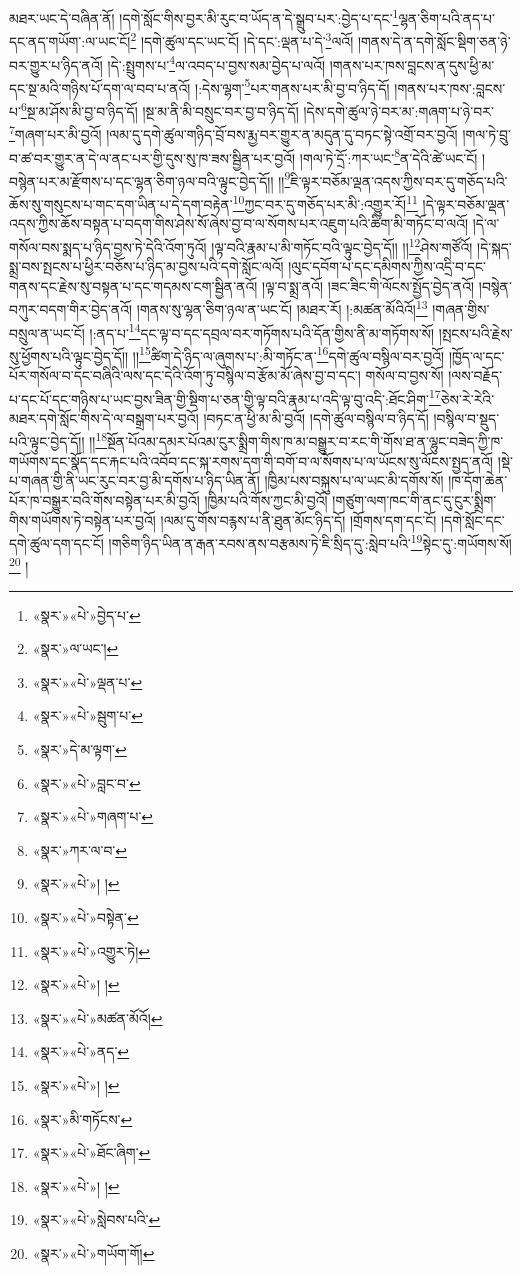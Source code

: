 མཐར་ཡང་དེ་བཞིན་ནོ། །དགེ་སློང་གིས་བྱར་མི་རུང་བ་ཡོད་ན་དེ་སྒྲུབ་པར་:བྱེད་པ་དང་\footnote{«སྣར་»«པེ་»བྱེད་པ་}ལྷན་ཅིག་པའི་ནད་པ་དང་ནད་གཡོག་:ལ་ཡང་ངོ།\footnote{«སྣར་»ལ་ཡང་།} །དགེ་ཚུལ་དང་ཡང་ངོ། །དེ་དང་:ལྡན་པ་དེ་\footnote{«སྣར་»«པེ་»ལྡན་པ་}ལའོ། །གནས་དེ་ན་དགེ་སློང་སྡིག་ཅན་ཉེ་བར་གྱུར་པ་ཉིད་ནའོ། །དེ་:སྤྲུགས་པ་\footnote{«སྣར་»«པེ་»སྦུག་པ་}ལ་འབད་པ་བྱས་སམ་བྱེད་པ་ལའོ། །གནས་པར་ཁས་བླངས་ན་དུས་ཕྱི་མ་དང་སྔ་མའི་གཉིས་པོ་དག་ལ་བབ་པ་ནའོ། །:དེས་ལྷག་\footnote{«སྣར་»དེ་མ་ལྟག་}པར་གནས་པར་མི་བྱ་བ་ཉིད་དོ། །གནས་པར་ཁས་:བླངས་པ་\footnote{«སྣར་»«པེ་»བླང་བ་}སྔ་མ་ཤོས་མི་བྱ་བ་ཉིད་དོ། །སྔ་མ་ནི་མི་བསྲུང་བར་བྱ་བ་ཉིད་དོ། །དེས་དགེ་ཚུལ་ཉེ་བར་མ་:གཞག་པ་ཉེ་བར་\footnote{«སྣར་»«པེ་»གཞག་པ་}གཞག་པར་མི་བྱའོ། །ལམ་དུ་དགེ་ཚུལ་གཉིད་བྲོ་བས་རྨྱ་བར་གྱུར་ན་མདུན་དུ་བཏང་སྟེ་འགྲོ་བར་བྱའོ། །གལ་ཏེ་བྲུ་བ་ཚ་བར་གྱུར་ན་དེ་ལ་ནང་པར་གྱི་དུས་སུ་ཁ་ཟས་སྦྱིན་པར་བྱའོ། །གལ་ཏེ་དྲོ་:ཀར་ཡང་\footnote{«སྣར་»ཀར་ལ་བ་}ན་དེའི་ཚེ་ཡང་ངོ། །བསྙེན་པར་མ་རྫོགས་པ་དང་ལྷན་ཅིག་ཉལ་བའི་ལྟུང་བྱེད་དོ།། །།\footnote{«སྣར་»«པེ་»། །}ཇི་ལྟར་བཅོམ་ལྡན་འདས་ཀྱིས་བར་དུ་གཅོད་པའི་ཆོས་སུ་གསུངས་པ་གང་དག་ཡིན་པ་དེ་དག་བརྟེན་\footnote{«སྣར་»«པེ་»བསྟེན་}ཀྱང་བར་དུ་གཅོད་པར་མི་:འགྱུར་རོ།\footnote{«སྣར་»«པེ་»འགྱུར་ཏེ།} །དེ་ལྟར་བཅོམ་ལྡན་འདས་ཀྱིས་ཆོས་བསྟན་པ་བདག་གིས་ཤེས་སོ་ཞེས་བྱ་བ་ལ་སོགས་པར་འཇུག་པའི་ཚིག་མི་གཏོང་བ་ལའོ། །དེ་ལ་གསོལ་བས་སྨད་པ་ཉིད་བྱས་ཏེ་དེའི་འོག་ཏུའོ། །ལྟ་བའི་རྣམ་པ་མི་གཏོང་བའི་ལྟུང་བྱེད་དོ།། །།\footnote{«སྣར་»«པེ་»། །}ཤེས་གཙོའོ། །དེ་སྐད་སྨྲ་བས་སྤངས་པ་ཕྱིར་བཅོས་པ་ཉིད་མ་བྱས་པའི་དགེ་སློང་ལའོ། །ལུང་དབོག་པ་དང་དམིགས་ཀྱིས་འདྲི་བ་དང་གནས་དང་རྗེས་སུ་བསྟན་པ་དང་གདམས་ངག་སྦྱིན་ནའོ། །ལྟ་བ་སྨྲ་ནའོ། །ཟང་ཟིང་གི་ལོངས་སྤྱོད་བྱེད་ནའོ། །བསྙེན་བཀུར་བདག་གིར་བྱེད་ནའོ། །གནས་སུ་ལྷན་ཅིག་ཉལ་ན་ཡང་ངོ། །མཐར་རོ། །:མཚན་མོའིའོ།\footnote{«སྣར་»«པེ་»མཚན་མོའོ།} །གཞན་གྱིས་བསྲུལ་ན་ཡང་ངོ། །:ནད་པ་\footnote{«སྣར་»«པེ་»ནད་}དང་ལྟ་བ་དང་དབྲལ་བར་གཏོགས་པའི་དོན་གྱིས་ནི་མ་གཏོགས་སོ། །སྤངས་པའི་རྗེས་སུ་ཕྱོགས་པའི་ལྟུང་བྱེད་དོ།། །།\footnote{«སྣར་»«པེ་»། །}ཚིག་དེ་ཉིད་ལ་ཞུགས་པ་:མི་གཏོང་ན་\footnote{«སྣར་»མི་གཏོངས་}དགེ་ཚུལ་བསྙིལ་བར་བྱའོ། །ཁྱོད་ལ་དང་པོར་གསོལ་བ་དང་བཞིའི་ལས་དང་དེའི་འོག་ཏུ་བསྙིལ་བ་རྩོམ་མོ་ཞེས་བྱ་བ་དང་། གསོལ་བ་བྱས་སོ། །ལས་བརྗོད་པ་དང་པོ་དང་གཉིས་པ་ཡང་བྱས་ཟིན་གྱི་སྡིག་པ་ཅན་གྱི་ལྟ་བའི་རྣམ་པ་འདི་ལྟ་བུ་འདི་:ཐོང་ཤིག་\footnote{«སྣར་»«པེ་»ཐོང་ཞིག་}ཅེས་རེ་རེའི་མཐར་དགེ་སློང་གིས་དེ་ལ་བསྒྲག་པར་བྱའོ། །བཏང་ན་ཕྱི་མ་མི་བྱའོ། །དགེ་ཚུལ་བསྙིལ་བ་ཉིད་དོ། །བསྙིལ་བ་སྡུད་པའི་ལྟུང་བྱེད་དོ།། །།\footnote{«སྣར་»«པེ་»། །}སྔོན་པོའམ་དམར་པོའམ་ངུར་སྨྲིག་གིས་ཁ་མ་བསྒྱུར་བ་རང་གི་གོས་ཐ་ན་ལྷུང་བཟེད་ཀྱི་ཁ་གཡོགས་དང་སྣོད་དང་རྐང་པའི་འབོབ་དང་སྐ་རགས་དག་གི་བགོ་བ་ལ་སོགས་པ་ལ་ཡོངས་སུ་ལོངས་སྤྱད་ནའོ། །སྡེ་པ་གཞན་གྱི་ནི་ཡང་རུང་བར་བྱ་མི་དགོས་པ་ཉིད་ཡིན་ནོ། །ཁྱིམ་པས་བསྐུས་པ་ལ་ཡང་མི་དགོས་སོ། །ཁ་དོག་ཆེན་པོར་ཁ་བསྒྱུར་བའི་གོས་བསྟེན་པར་མི་བྱའོ། །ཁྱིམ་པའི་གོས་ཀྱང་མི་བྱའོ། །གཙུག་ལག་ཁང་གི་ནང་དུ་ངུར་སྨྲིག་གིས་གཡོགས་ཏེ་བསྟེན་པར་བྱའོ། །ལམ་དུ་གོས་བརྙས་པ་ནི་ཐུན་མོང་ཉིད་དོ། །གྲོགས་དག་དང་ངོ། །དགེ་སློང་དང་དགེ་ཚུལ་དག་དང་ངོ། །གཅིག་ཉིད་ཡིན་ན་རྒན་རབས་ནས་བརྩམས་ཏེ་ཇི་སྲིད་དུ་:སླེབ་པའི་\footnote{«སྣར་»«པེ་»སླེབས་པའི་}སྟེང་དུ་:གཡོགས་སོ།\footnote{«སྣར་»«པེ་»གཡོག་གོ།} །
